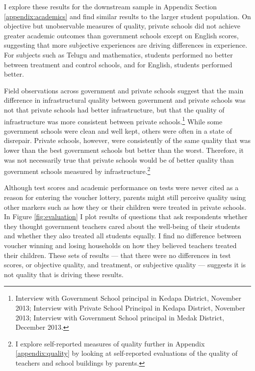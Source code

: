 \documentclass[hidelinks, 12pt, titlepage]{article}
\begin{document}
		I explore these results for the downstream sample in Appendix Section \ref{appendix:academics} and find similar results to the larger student population.  On objective but unobservable measures of quality, private schools did not achieve greater academic outcomes than government schools except on English scores, suggesting that more subjective experiences are driving differences in experience.  For subjects such as Telugu and mathematics, students performed no better between treatment and control schools, and for English, students performed better.

		Field observations across government and private schools suggest that the main difference in infrastructural quality between government and private schools was not that private schools had better infrastructure, but that the quality of infrastructure was more consistent between private schools.\footnote{Interview with Government School principal in Kedapa District, November 2013; Interview with Private School Principal in Kedapa District, November 2013; Interview with Government School principal in Medak District, December 2013.}  While some government schools were clean and well kept, others were often in a state of disrepair.  Private schools, however, were consistently of the same quality that was lower than the best government schools but better than the worst.  Therefore, it was not necessarily true that private schools would be of better quality than government schools measured by infrastructure.\footnote{I explore self-reported measures of quality further in Appendix \ref{appendix:quality} by looking at self-reported evaluations of the quality of teachers and school buildings by parents.}

		Although test scores and academic performance on tests were never cited as a reason for entering the voucher lottery, parents might still perceive quality using other markers such as how they or their children were treated in private schools.  In Figure \ref{fig:evaluation} I plot results of questions that ask respondents whether they thought government teachers cared about the well-being of their students and whether they also treated all students equally.  I find no difference between voucher winning and losing households on how they believed teachers treated their children.  These sets of results --- that there were no differences in test scores, or objective quality, and treatment, or subjective quality --- suggests it is not quality that is driving these results.
\end{document}
